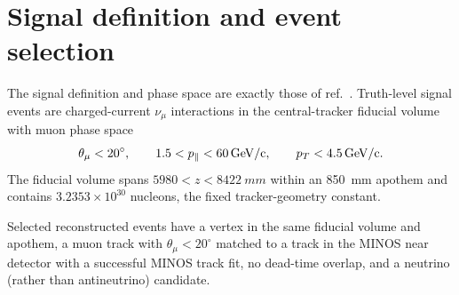 

\section{Signal definition and event selection}
\label{supp:selection}

\label{sec:selection}
The signal definition and phase space are exactly those of ref.~\cite{MINERvA:2021owq}. Truth-level signal events are charged-current $\nu_\mu$ interactions in the central-tracker fiducial volume with muon phase space
\begin{equation*}
  \theta_\mu < 20^{\circ},\qquad
  1.5 < p_{\parallel} < \SI{60}{GeV/c},\qquad
  p_{T} < \SI{4.5}{GeV/c}.
\end{equation*}
The fiducial volume spans $5980 < z < \SI{8422}{mm}$ within an \SI{850}{mm} apothem and contains $3.2353\times10^{30}$ nucleons, the fixed tracker-geometry constant.

Selected reconstructed events have a vertex in the same fiducial volume and apothem, a muon track with $\theta_\mu<20^{\circ}$ matched to a track in the MINOS near detector with a successful MINOS track fit, no dead-time overlap, and a neutrino (rather than antineutrino) candidate.

